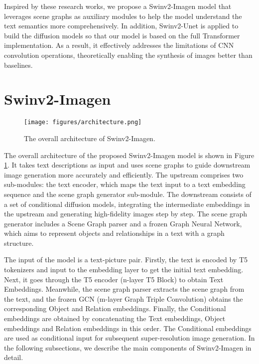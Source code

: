\documentclass{article}
\begin{document}
Inspired by these research works, we propose a Swinv2-Imagen model that leverages scene graphs as auxiliary modules to help the model understand the text semantics more comprehensively. In addition, Swinv2-Unet is applied to build the diffusion models so that our model is based on the full Transformer implementation. As a result, it effectively addresses the limitations of CNN convolution operations, theoretically enabling the synthesis of images better than baselines.




\section{Swinv2-Imagen}

\begin{figure}[!ht]
    \centering
    \texttt{[image: figures/architecture.png]}
    \caption{The overall architecture of Swinv2-Imagen.}
    \label{fig:architecture}
\end{figure}

The overall architecture of the proposed Swinv2-Imagen model is shown in Figure \ref{fig:architecture}. It takes text descriptions as input and uses scene graphs to guide downstream image generation more accurately and efficiently. The upstream comprises two sub-modules: the text encoder, which maps the text input to a text embedding sequence and the scene graph generator sub-module. The downstream consists of a set of conditional diffusion models, integrating the intermediate embeddings in the upstream and generating high-fidelity images step by step. The scene graph generator includes a Scene Graph parser and a frozen Graph Neural Network, which aims to represent objects and relationships in a text with a graph structure. 

The input of the model is a text-picture pair. Firstly, the text is encoded by T5 tokenizers and input to the embedding layer to get the initial text embedding. Next, it goes through the T5 encoder (n-layer T5 Block) to obtain Text Embeddings. Meanwhile, the scene graph parser extracts the scene graph from the text, and the frozen GCN (m-layer Graph Triple Convolution) obtains the corresponding Object and Relation embeddings. Finally, the Conditional embeddings are obtained by concatenating the Text embeddings, Object embeddings and Relation embeddings in this order. The Conditional embeddings are used as conditional input for subsequent super-resolution image generation. In the following subsections, we describe the main components of Swinv2-Imagen in detail.
\end{document}
